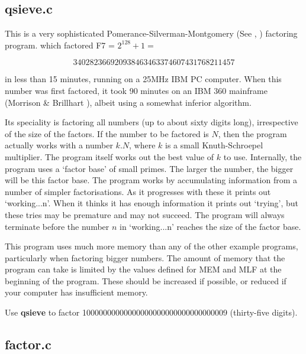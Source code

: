       \subsection{qsieve.c}

      This is a  very  sophisticated Pomerance-Silverman-Montgomery 
      (See \cite{Pomerance}, \cite{Silverman})  factoring  program.  
      which factored F7 = $2^{128} +1 =$ 

               $$  340282366920938463463374607431768211457 $$

      in less than 15 minutes, running on a 25MHz IBM PC computer. When 
      this number was first factored, it took 90 minutes on an IBM 360 
      mainframe (Morrison \& Brillhart \cite{Morrison}), albeit using a 
      somewhat inferior algorithm. 

      Its  speciality  is factoring all numbers (up to 
      about sixty digits long), irrespective of the size of the factors. If 
      the number to be factored is $N$,  then the program actually works with 
      a  number  $k.N$,  where  $k$ is a small Knuth-Schroepel multiplier.  The 
      program itself works out the best value of $k$ to use. Internally,  the 
      program uses a `factor base' of small primes. The larger the number, 
      the bigger will be  this  factor  base.  The  program  works  by  
      accumulating information from a number of simpler factorisations. As 
      it progresses with these it prints out `working...n'.  When it thinks 
      it has enough information it prints out `trying',  but these tries 
      may be premature and  may  not  succeed.  The program will always 
      terminate before the number $n$ in `working...n' reaches the size of 
      the factor base.  


      This program uses much more memory than  any  of  the  other  example 
      programs,  particularly when factoring bigger numbers.  The amount of 
      memory that the program can take is limited by the values defined for 
      MEM and MLF  at  the  beginning  of  the  program.  These  should  be 
      increased  if possible,  or reduced if your computer has insufficient 
      memory.  

      Use {\bf qsieve} to factor 10000000000000000000000000000000009 
      (thirty-five digits).

      \subsection{factor.c}

